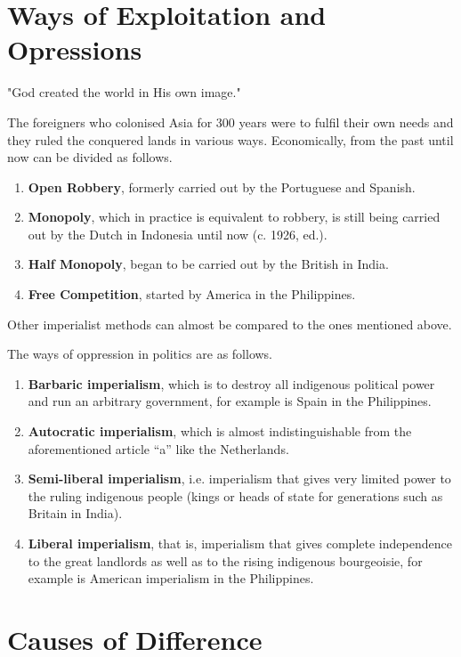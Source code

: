 \section{Ways of Exploitation and Opressions}

"God created the world in His own image."\vskip 0.2in

The foreigners who colonised Asia for 300 years were to fulfil 
their own needs and they ruled the conquered lands in various ways. 
Economically, from the past until now can be divided as follows.\vskip 0.2in

\begin{enumerate}
    \item \textbf{Open Robbery}, formerly carried out by the Portuguese and Spanish.
    \item \textbf{Monopoly}, which in practice is equivalent to robbery, is still being carried out by the Dutch in Indonesia until now (c. 1926, ed.).
    \item \textbf{Half Monopoly}, began to be carried out by the British in India.
    \item \textbf{Free Competition}, started by America in the Philippines.
\end{enumerate}

Other imperialist methods can almost be compared to the ones mentioned above.\vskip 0.2in

The ways of oppression in politics are as follows.

\begin{enumerate}
    \item \textbf{Barbaric imperialism}, which is to destroy all indigenous political power and run an arbitrary government, for example is Spain in the Philippines.
    \item \textbf{Autocratic imperialism}, which is almost indistinguishable from the aforementioned article “a” like the Netherlands.
    \item \textbf{Semi-liberal imperialism}, i.e. imperialism that gives very limited power to the ruling indigenous people (kings or heads of state for generations such as Britain in India).
    \item \textbf{Liberal imperialism}, that is, imperialism that gives complete independence to the great landlords as well as to the rising indigenous bourgeoisie, for example is American imperialism in the Philippines.
\end{enumerate}

\section{Causes of Difference}

